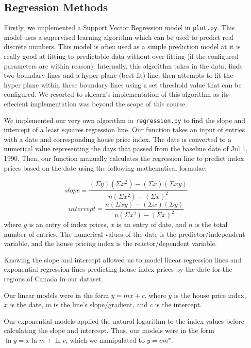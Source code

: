 \documentclass{article}
\begin{document}
\subsection{Regression Methods}

Firstly, we implemented a Support Vector Regression model in \texttt{plot.py}. This model uses a supervised learning algorithm which can be used to predict real discrete numbers. This model is often used as a simple prediction model at it is really good at fitting to predictable data without over fitting (if the configured parameters are within reason). Internally, this algorithm takes in the data, finds two boundary lines and a hyper plane (best fit) line, then attempts to fit the hyper plane within these boundary lines using a set threshold value that can be configured. We resorted to sklearn's implementation of this algorithm as its effecient implementation was beyond the scope of this course.

We implemented our very own algorithm in \texttt{regression.py} to find the slope and intercept of a least squares regression line. Our function takes an input of entries with a date and corresponding house price index. The date is converted to a numerical value representing the days that passed from the baseline date of Jul 1, 1990. Then, our function manually calculates the regression line to predict index prices based on the date using the following mathematical formulae:

$$slope = \frac{(\Sigma y)(\Sigma x^2) - (\Sigma x)(\Sigma xy)}{n(\Sigma x^2) - (\Sigma x)^2}$$
$$intercept = \frac{n(\Sigma xy) - (\Sigma x)(\Sigma y)}{n(\Sigma x^2) - (\Sigma x)^2}$$
where $y$ is an entry of index prices, $x$ is an entry of date, and $n$ is the total number of entries. The numerical values of the date is the predictor/independent variable, and the house pricing index is the reactor/dependent variable.

Knowing the slope and intercept allowed us to model linear regression lines and exponential regression lines predicting house index prices by the date for the regions of Canada in our dataset.

Our linear models were in the form $y = mx + c$, where $y$ is the house price index, $x$ is the date,  $m$ is the line's slope/gradient, and $c$ is the intercept.

Our exponential models applied the natural logarithm to the index values before calculating the slope and intercept. Thus, our models were in the form $\ln y = x \ln m + \ln c$, which we manipulated to $y = c m^x$.
\end{document}
